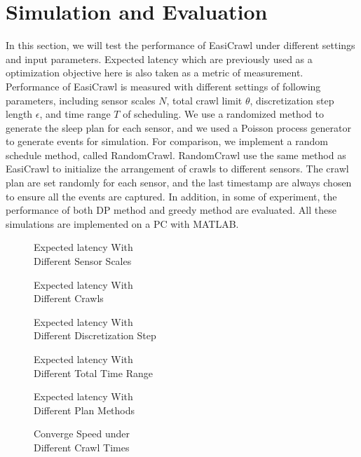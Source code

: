 \documentclass[conference]{IEEEtran}
\begin{document}
\section{Simulation and Evaluation} \label{simulation}
In this section, we will test the performance of EasiCrawl under different settings and input parameters. 
Expected latency which are previously used as a optimization objective here is also taken as a metric of measurement.
Performance of EasiCrawl is measured with different settings of following parameters, including sensor scales $N$, total crawl limit $\theta$, discretization step length $\epsilon$, and time range $T$ of scheduling. 
We use a randomized method to generate the sleep plan for each sensor, and we used a Poisson process generator to generate events for simulation.
For comparison, we implement a random schedule method, called RandomCrawl. 
RandomCrawl use the same method as EasiCrawl to initialize the arrangement of crawls to different sensors. 
The crawl plan are set randomly for each sensor, and the last timestamp are always chosen to ensure all the events are captured. 
In addition, in some of experiment, the performance of both DP method and greedy method are evaluated.
All these simulations are implemented on a PC with MATLAB.
\begin{figure*}
		
		\captionsetup{justification=centering}
		\caption{Expected latency With \\Different Sensor Scales}
		\label{fig:test1_sensorscale}
	\endminipage\hfill
		
		\captionsetup{justification=centering}
		\caption{Expected latency With \\Different Crawls}
		\label{fig:test2_totalcrawl}
	\endminipage\hfill
		
		\captionsetup{justification=centering}
		\caption{Expected latency With \\Different Discretization Step}
		\label{fig:test3_discretestep}
	\endminipage
	
		
		\captionsetup{justification=centering}
		\caption{Expected latency With \\Different Total Time Range}
		\label{fig:test4_timerange}
	\endminipage\hfill
		
		\captionsetup{justification=centering}
		\caption{Expected latency With \\Different Plan Methods}
		\label{fig:test5_sensortype}
	\endminipage\hfill
		
		\captionsetup{justification=centering}
		\caption{Converge Speed under \\Different Crawl Times}
		\label{fig:test6_convergespeed}
	\endminipage	
	\vspace{-1.0em}
\end{figure*}	
\end{document}
